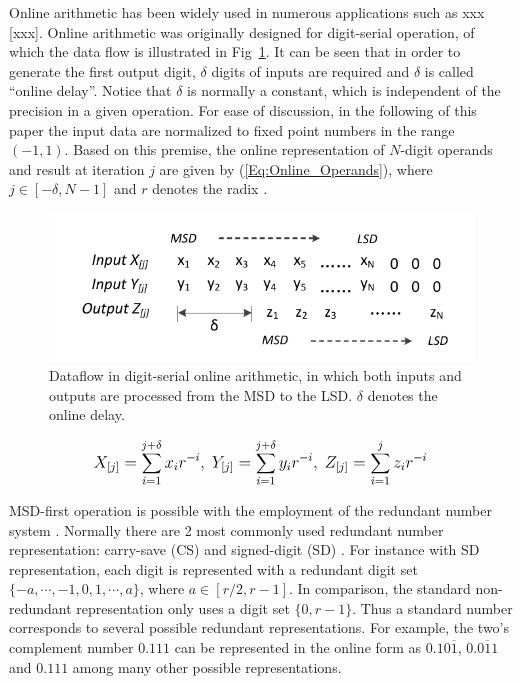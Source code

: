 \documentclass[conference]{IEEEtran}
\begin{document}
Online arithmetic has been widely used in numerous applications such as xxx [xxx]. Online arithmetic was originally designed for digit-serial operation, of which the data flow is illustrated in Fig~\ref{Fig:OnlineDataFlow}. It can be seen that in order to generate the first output digit, $\delta$ digits of inputs are required and $\delta$ is called ``online delay''. Notice that $\delta$ is normally a constant, which is independent of the precision in a given operation. For ease of discussion, in the following of this paper the input data are normalized to fixed point numbers in the range $(-1,1)$. Based on this premise, the online representation of $N$-digit operands and result at iteration $j$ are given by (\ref{Eq:Online_Operands}), where $j\in[-\delta,N-1]$ and $r$ denotes the radix \cite{Ercegovac_Book}.

\begin{figure}[tbp]
  \centering
  \includegraphics[width=.48\textwidth]{./Figures/OnlineArithmetic_DataFlow.pdf}
  \caption{Dataflow in digit-serial online arithmetic, in which both inputs and outputs are processed from the MSD to the LSD. $\delta$ denotes the online delay.}
  \label{Fig:OnlineDataFlow}
\end{figure}

\begin{eqnarray}\label{Eq:Online_Operands}
\footnotesize
  X_{[j]}=\sum_{i=1}^{j+\delta}x_ir^{-i},~Y_{[j]}=\sum_{i=1}^{j+\delta}y_ir^{-i},~Z_{[j]}=\sum_{i=1}^{j}z_ir^{-i}
\normalsize
\end{eqnarray}

MSD-first operation is possible with the employment of the redundant number system . Normally there are 2 most commonly used redundant number representation: carry-save (CS) \cite{CSadder} and signed-digit (SD) \cite{RedundantNumber}. For instance with SD representation, each digit is represented with a redundant digit set $\{-a, \cdots,-1,0, 1, \cdots, a\}$, where $a\in[r/2,r-1]$. In comparison, the standard non-redundant representation only uses a digit set $\{0,r-1\}$. Thus a standard number corresponds to several possible redundant representations. For example, the two's complement number $0.111$ can be represented in the online form as $0.10\overline{1}$, $0.0\overline{1}1$ and $0.111$ among many other possible representations.
\end{document}
